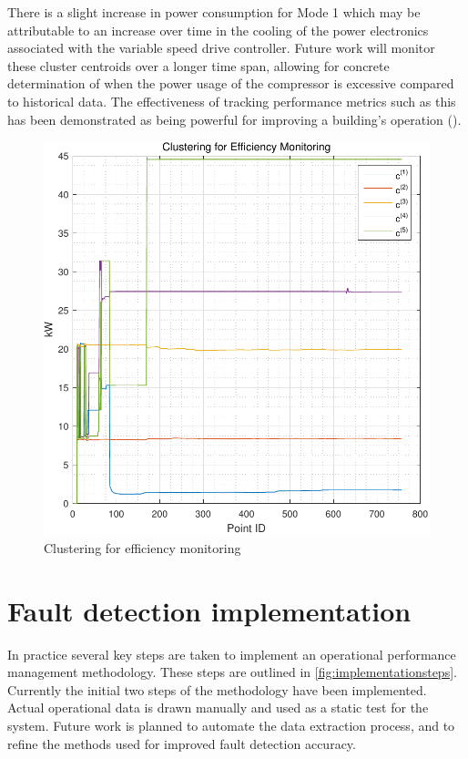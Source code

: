 There is a slight increase in power consumption for Mode 1 which may be attributable to an increase over time in the cooling of the power electronics associated with the variable speed drive controller. Future work will monitor these cluster centroids over a longer time span, allowing for concrete determination of when the power usage of the compressor is excessive compared to historical data. The effectiveness of tracking performance metrics such as this has been demonstrated as being powerful for improving a building's operation (\cite{OSullivan2004}).

\begin{figure}
\includegraphics[width = \columnwidth]{./Images/EfficiencyDegradation.pdf}
\caption{Clustering for efficiency monitoring}
\label{fig:efficiencymonitoring}
\end{figure}

\section{Fault detection implementation}
\label{sec:results}

In practice several key steps are taken to implement an operational performance management methodology. These steps are outlined in \autoref{fig:implementationsteps}. Currently the initial two steps of the methodology have been implemented. Actual operational data is drawn manually and used as a static test for the system. Future work is planned to automate the data extraction process, and to refine the methods used for improved fault detection accuracy.

